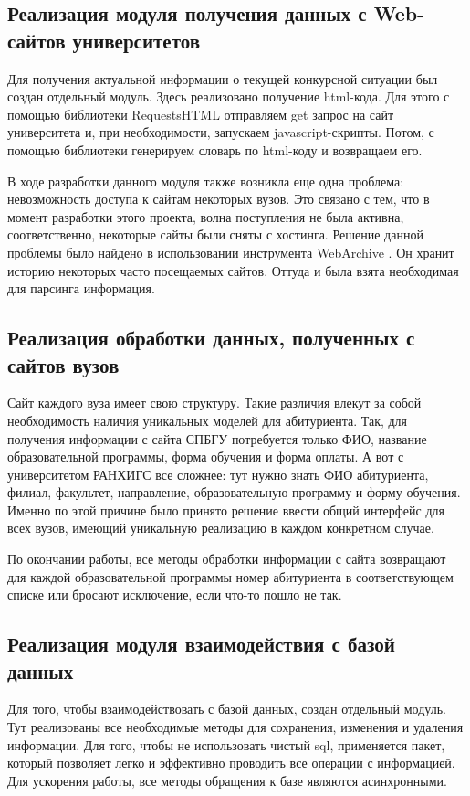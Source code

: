 \documentclass[a4paper,article,14pt]{extarticle}
\begin{document}
\subsection{Реализация модуля получения данных с Web-сайтов университетов}

Для получения актуальной информации о текущей конкурсной ситуации был создан отдельный модуль. Здесь реализовано получение html-кода. Для этого с помощью библиотеки RequestsHTML отправляем get запрос на сайт университета и, при необходимости, запускаем javascript-скрипты. Потом, с помощью библиотеки генерируем словарь по html-коду и возвращаем его. 

В ходе разработки данного модуля также возникла еще одна проблема: невозможность доступа к сайтам некоторых вузов. Это связано с тем, что в момент разработки этого проекта, волна поступления не была активна, соответственно, некоторые сайты были сняты с хостинга. Решение данной проблемы было найдено в использовании инструмента WebArchive \cite{webarchive}. Он хранит историю некоторых часто посещаемых сайтов. Оттуда и была взята необходимая для парсинга информация.

\subsection{Реализация обработки данных, полученных с сайтов вузов}

Сайт каждого вуза имеет свою структуру. Такие различия влекут за собой необходимость наличия уникальных моделей для абитуриента. Так, для получения информации с сайта СПБГУ потребуется только ФИО, название образовательной программы, форма обучения и форма оплаты. А вот с университетом РАНХИГС все сложнее: тут нужно знать ФИО абитуриента, филиал, факультет, направление, образовательную программу и форму обучения. Именно по этой причине было принято решение ввести общий интерфейс для всех вузов, имеющий уникальную реализацию в каждом конкретном случае. 

По окончании работы, все методы обработки информации с сайта возвращают для каждой образовательной программы номер абитуриента в соответствующем списке или бросают исключение, если что-то пошло не так.

\subsection{Реализация модуля взаимодействия с базой данных}

Для того, чтобы взаимодействовать с базой данных, создан отдельный модуль. Тут реализованы все необходимые методы для сохранения, изменения и удаления информации. Для того, чтобы не использовать чистый sql, применяется пакет, который позволяет легко и эффективно проводить все операции с информацией. Для ускорения работы, все методы обращения к базе являются асинхронными.
\end{document}

